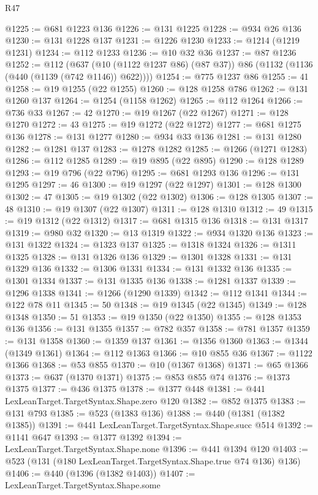 \begin{lexlean}{R47}
\begin{coremodule}
@1225 := @681 @1223 @136
@1226 := @131 @1225
@1228 := @934 @26 @136
@1230 := @131 @1228 @137
@1231 := @1226 @1230
@1233 := @1214 (@1219 @1231)
@1234 := @112 @1233
@1236 := @10 @32 @36
@1237 := @87 @1236
@1252 := @112
    (@637 (@10 (@1122 @1237 @86) (@87 @37)) @86 (@1132 (@1136 (@440 (@1139 (@742 @1146)) @622))))
@1254 := @775 @1237 @86
@1255 := 41
@1258 := @19 @1255 (@22 @1255)
@1260 := @128 @1258 @786
@1262 := @131 @1260 @137
@1264 := @1254 (@1158 @1262)
@1265 := @112 @1264
@1266 := @736 @33
@1267 := 42
@1270 := @19 @1267 (@22 @1267)
@1271 := @128 @1270
@1272 := 43
@1275 := @19 @1272 (@22 @1272)
@1277 := @681 @1275 @136
@1278 := @131 @1277
@1280 := @934 @33 @136
@1281 := @131 @1280
@1282 := @1281 @137
@1283 := @1278 @1282
@1285 := @1266 (@1271 @1283)
@1286 := @112 @1285
@1289 := @19 @895 (@22 @895)
@1290 := @128 @1289
@1293 := @19 @796 (@22 @796)
@1295 := @681 @1293 @136
@1296 := @131 @1295
@1297 := 46
@1300 := @19 @1297 (@22 @1297)
@1301 := @128 @1300
@1302 := 47
@1305 := @19 @1302 (@22 @1302)
@1306 := @128 @1305
@1307 := 48
@1310 := @19 @1307 (@22 @1307)
@1311 := @128 @1310
@1312 := 49
@1315 := @19 @1312 (@22 @1312)
@1317 := @681 @1315 @136
@1318 := @131 @1317
@1319 := @980 @32
@1320 := @13 @1319
@1322 := @934 @1320 @136
@1323 := @131 @1322
@1324 := @1323 @137
@1325 := @1318 @1324
@1326 := @1311 @1325
@1328 := @131 @1326 @136
@1329 := @1301 @1328
@1331 := @131 @1329 @136
@1332 := @1306 @1331
@1334 := @131 @1332 @136
@1335 := @1301 @1334
@1337 := @131 @1335 @136
@1338 := @1281 @1337
@1339 := @1296 @1338
@1341 := @1266 (@1290 @1339)
@1342 := @112 @1341
@1344 := @122 @78 @11
@1345 := 50
@1348 := @19 @1345 (@22 @1345)
@1349 := @128 @1348
@1350 := 51
@1353 := @19 @1350 (@22 @1350)
@1355 := @128 @1353 @136
@1356 := @131 @1355
@1357 := @782 @357
@1358 := @781 @1357
@1359 := @131 @1358
@1360 := @1359 @137
@1361 := @1356 @1360
@1363 := @1344 (@1349 @1361)
@1364 := @112 @1363
@1366 := @10 @855 @36
@1367 := @1122 @1366
@1368 := @53 @855
@1370 := @10 (@1367 @1368)
@1371 := @65 @1366
@1373 := @637 (@1370 @1371)
@1375 := @853 @855 @74
@1376 := @1373 @1375
@1377 := @436 @1375
@1378 := @1377 @448
@1381 := @441 LexLeanTarget.TargetSyntax.Shape.zero @120
@1382 := @852 @1375
@1383 := @131 @793
@1385 := @523 (@1383 @136)
@1388 := @440 (@1381 (@1382 @1385))
@1391 := @441 LexLeanTarget.TargetSyntax.Shape.succ @514
@1392 := @1141 @647
@1393 := @1377 @1392
@1394 := LexLeanTarget.TargetSyntax.Shape.none
@1396 := @441 @1394 @120
@1403 := @523 (@131 (@180 LexLeanTarget.TargetSyntax.Shape.true @74 @136) @136)
@1406 := @440 (@1396 (@1382 @1403))
@1407 := LexLeanTarget.TargetSyntax.Shape.some

\end{coremodule}
\end{lexlean}
